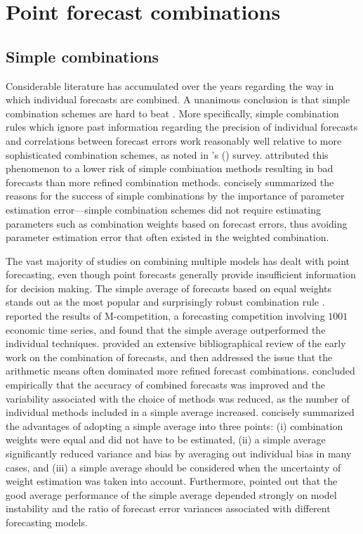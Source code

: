 \documentclass[11pt]{article}
\def\citeapos#1{\citeauthor{#1}'s (\citeyear{#1})}
\begin{document}
\section{Point forecast combinations}

\subsection{Simple combinations}

Considerable literature has accumulated over the years regarding the way in which individual forecasts are combined. A unanimous conclusion is that simple combination schemes are hard to beat \citep{Clemen1989-fb,Stock2004-rq,Lichtendahl2020-ut}. More specifically, simple combination rules which ignore past information regarding the precision of individual forecasts and correlations between forecast errors work reasonably well relative to more sophisticated combination schemes, as noted in \citeapos{Clemen1989-fb} survey. \cite{Lichtendahl2020-ut} attributed this phenomenon to a lower risk of simple combination methods resulting in bad forecasts than more refined combination methods. \cite{Timmermann2006-en} concisely summarized the reasons for the success of simple combinations by the importance of parameter estimation error---simple combination schemes did not require estimating parameters such as combination weights based on forecast errors, thus avoiding parameter estimation error that often existed in the weighted combination.

The vast majority of studies on combining multiple models has dealt with point forecasting, even though point forecasts generally provide insufficient information for decision making. The simple average of forecasts based on equal weights stands out as the most popular and surprisingly robust combination rule \citep[see][]{Bunn1985-vo,Clemen1986-pd,Stock2003-sp,Genre2013-ut}. \cite{Makridakis1982-hb} reported the results of M-competition, a forecasting competition involving $1001$ economic time series, and found that the simple average outperformed the individual techniques. \cite{Clemen1989-fb} provided an extensive bibliographical review of the early work on the combination of forecasts, and then addressed the issue that the arithmetic means often dominated more refined forecast combinations. \cite{Makridakis1983-hg} concluded empirically that the accuracy of combined forecasts was improved and the variability associated with the choice of methods was reduced, as the number of individual methods included in a simple average increased. \cite{Palm1992-im} concisely summarized the advantages of adopting a simple average into three points: (i) combination weights were equal and did not have to be estimated, (ii) a simple average significantly reduced variance and bias by averaging out individual bias in many cases, and (iii) a simple average should be considered when the uncertainty of weight estimation was taken into account. Furthermore, \cite{Timmermann2006-en} pointed out that the good average performance of the simple average depended strongly on model instability and the ratio of forecast error variances associated with different forecasting models.
\end{document}
